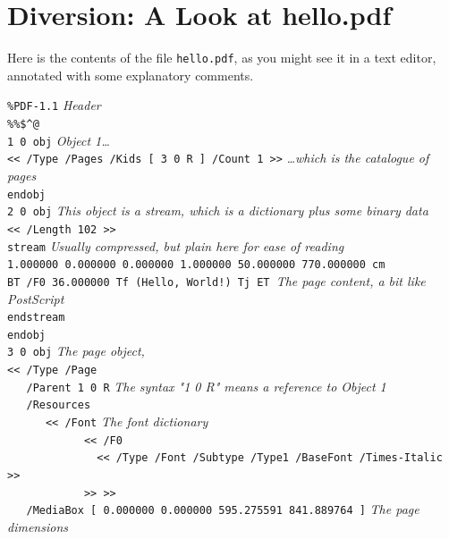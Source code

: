 \documentclass[a4paper]{memoir}
\begin{document}
\clearpage

\section*{Diversion: A Look at hello.pdf}
Here is the contents of the file \texttt{hello.pdf}, as you might see it in a text editor, annotated with some explanatory comments.
\begin{framed}
\noindent\small\verb!%PDF-1.1! \textit{Header}\\
\noindent\small\verb!%%$^@!\\
\noindent\small\verb!1 0 obj! \textit{Object 1\ldots}\\
\noindent\small\verb!<< /Type /Pages /Kids [ 3 0 R ] /Count 1 >>! \textit{\ldots which is the catalogue of pages}\\
\noindent\small\verb!endobj!\\
\noindent\small\verb!2 0 obj! \textit{This object is a stream, which is a dictionary plus some binary data}\\
\noindent\small\verb!<< /Length 102 >>!\\
\noindent\small\verb!stream! \textit{Usually compressed, but plain here for ease of reading}\\
\noindent\small\verb!1.000000 0.000000 0.000000 1.000000 50.000000 770.000000 cm!\\
\noindent\small\verb$BT /F0 36.000000 Tf (Hello, World!) Tj ET $\textit{The page content, a bit like PostScript}\\
\noindent\small\verb!endstream!\\
\noindent\small\verb!endobj!\\
\noindent\small\verb!3 0 obj! \textit{The page object, }\\
\noindent\small\verb!<< /Type /Page!\\
\noindent\small\verb!   /Parent 1 0 R! \textit{The syntax "1 0 R" means a reference to Object 1}\\ 
\noindent\small\verb!   /Resources!\\
\noindent\small\verb!      << /Font! \textit{The font dictionary}\\
\noindent\small\verb!            << /F0!\\
\noindent\small\verb!              << /Type /Font /Subtype /Type1 /BaseFont /Times-Italic >>!\\
\noindent\small\verb!            >> >>!\\
\noindent\small\verb!   /MediaBox [ 0.000000 0.000000 595.275591 841.889764 ]! \textit{The page dimensions}\\

\end{framed}
\end{document}

